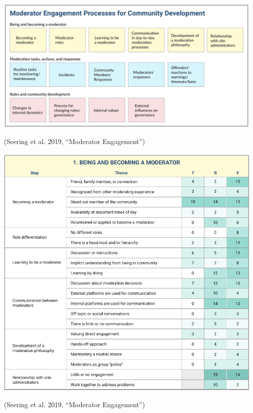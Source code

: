 \documentclass[nobackground,dvipsnames,table]{beamer}
\begin{document}
\begin{frame}{}

\vspace*{5ex}

\includegraphics[width=\textwidth]{img/fig16.jpg}

\vfill
\vspace{10ex}
\scriptsize{\color{lightgray}(Seering et al. 2019, “Moderator Engagement”)}

\end{frame}

\begin{frame}{}

\vspace*{1ex}
\begin{center}
   \includegraphics[scale=.425]{img/fig17.1.jpg} 
\end{center}

\vspace{5ex}
\scriptsize{\color{lightgray}(Seering et al. 2019, “Moderator Engagement”)}

\end{frame}
\end{document}
